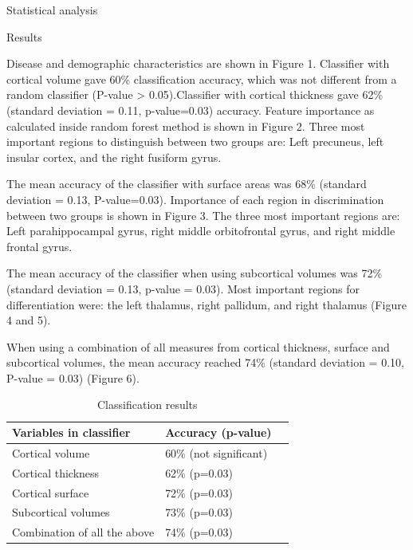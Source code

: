\documentclass[final]{beamer}
\newlength{\onecolwid}
\newlength{\twocolwid}
\begin{document}
\begin{frame}[t]
\begin{columns}[t]
\begin{column}{\twocolwid}
\begin{columns}[t,totalwidth=\twocolwid]
\begin{column}{\onecolwid}
\begin{block}{Statistical analysis}
\end{block}



\begin{block}{Results}

Disease and demographic characteristics are shown in Figure 1.
Classifier with cortical volume gave 60\% classification accuracy, which was not different from a random classifier (P-value > 0.05).Classifier with cortical thickness gave 62\% (standard deviation = 0.11, p-value=0.03) accuracy. Feature importance as calculated inside random forest method is shown in Figure 2. Three most important regions to distinguish between two groups are: Left precuneus, left insular cortex, and the right fusiform gyrus.

The mean accuracy of the classifier with surface areas was 68\% (standard deviation = 0.13, P-value=0.03). Importance of each region in discrimination between two groups is shown in Figure 3. The three most important regions are: Left parahippocampal gyrus, right middle orbitofrontal gyrus, and right middle frontal gyrus.

The mean accuracy of the classifier when using subcortical volumes was 
72\% (standard deviation = 0.13, p-value = 0.03). Most important regions for differentiation were: the left thalamus, right pallidum, and right thalamus (Figure 4 and 5).

When using a combination of all measures from cortical thickness, surface and subcortical volumes, the mean accuracy reached 74\% (standard deviation = 0.10, P-value = 0.03) (Figure 6).




\begin{table}
\vspace{4ex}
\begin{tabular}{l l l}
\toprule
\textbf{Variables in classifier} & {Accuracy (p-value)}\\
\midrule
Cortical volume & 60\% (not significant) \\
Cortical thickness & 62\% (p=0.03) \\
Cortical surface & 72\% (p=0.03) \\
Subcortical volumes & 73\% (p=0.03) \\
Combination of all the above & 74\% (p=0.03) \\
\bottomrule
\end{tabular}
\caption{Classification results}
\end{table}


\end{block}
\end{column}
\end{columns}
\end{column}
\end{columns}
\end{frame}
\end{document}
